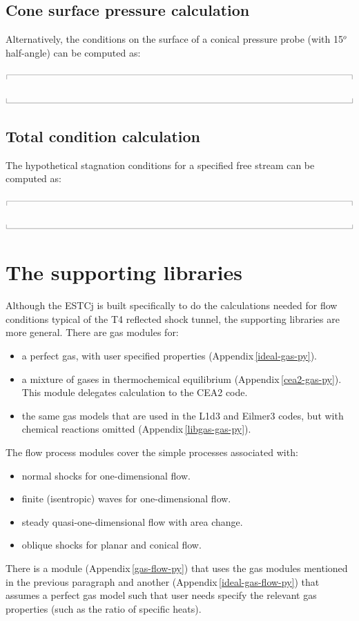 \documentclass[10pt,a4paper]{article}
\newcommand{\topbar}{\ensuremath{
    \rule{0.1mm}{2.0mm} \rule[2.0mm]{159.5mm}{0.1mm} \rule{0.1mm}{2.0mm}
}}
\newcommand{\bottombar}{\ensuremath{
    \rule{0.1mm}{2.0mm} \rule{159.5mm}{0.1mm} \rule{0.1mm}{2.0mm}
}}
\begin{document}
\subsection{Cone surface pressure calculation}
%
Alternatively, the conditions on the surface of a conical pressure probe
(with 15$^o$ half-angle) can be computed as:

\medskip
\noindent\topbar

\bottombar

\bigskip
\subsection{Total condition calculation}
%
The hypothetical stagnation conditions for a specified free stream
can be computed as:

\medskip
\noindent\topbar

\bottombar

\newpage
\section{The supporting libraries}
\label{the-libraries}
%
Although the ESTCj is built specifically to do the calculations 
needed for flow conditions typical of the T4 reflected shock tunnel,
the supporting libraries are more general.
There are gas modules for:
\begin{itemize}
 \item a perfect gas, with user specified properties (Appendix\,\ref{ideal-gas-py}).
 \item a mixture of gases in thermochemical equilibrium (Appendix\,\ref{cea2-gas-py}).
   This module delegates calculation to the CEA2 code.
 \item the same gas models that are used in the L1d3 and Eilmer3 codes,
   but with chemical reactions omitted (Appendix\,\ref{libgas-gas-py}).
\end{itemize}
%
The flow process modules cover the simple processes associated with:
\begin{itemize}
 \item normal shocks for one-dimensional flow.
 \item finite (isentropic) waves for one-dimensional flow.
 \item steady quasi-one-dimensional flow with area change.
 \item oblique shocks for planar and conical flow.
\end{itemize}
There is a module (Appendix\,\ref{gas-flow-py}) that uses 
the gas modules mentioned in the previous paragraph
and another (Appendix\,\ref{ideal-gas-flow-py})
that assumes a perfect gas model such that user needs specify the
relevant gas properties (such as the ratio of specific heats).
\end{document}
